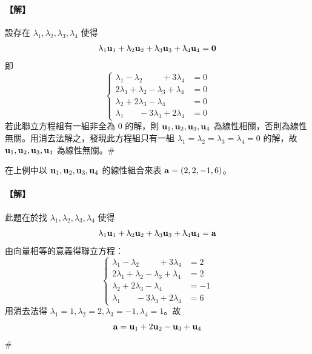 \paragraph{【解】}
設存在 $\lambda_1, \lambda_2, \lambda_3, \lambda_4$ 使得
\[ \uplambda_1\boldsymbol{\mathbf{u}}_1 + \uplambda_2\boldsymbol{\mathbf{u}}_2 + \uplambda_3\boldsymbol{\mathbf{u}}_3 + \uplambda_4\boldsymbol{\mathbf{u}}_4 = \boldsymbol{\mathbf{0}} \]
即
\begin{equation}
\left\{\begin{aligned}
\lambda_1 - \lambda_2 \phantom{+ 2\lambda_3} + 3\lambda_4 &= 0 \\
2\lambda_1 + \lambda_2 - \lambda_3 + \lambda_4 &= 0 \\
\lambda_2 + 2\lambda_3 - \lambda_4 &= 0 \\
\lambda_1 \phantom{+ \lambda_2} - 3\lambda_3 + 2\lambda_4 &= 0
\end{aligned}\right. \label{eq:b6-1-1-9}
\end{equation}
若此聯立方程組有一組非全為 0 的解，則 $\boldsymbol{\mathbf{u}}_1, \boldsymbol{\mathbf{u}}_2, \boldsymbol{\mathbf{u}}_3, \boldsymbol{\mathbf{u}}_4$ 為線性相關，否則為線性無關。用消去法解之，發現此方程組只有一組 $\lambda_1=\lambda_2=\lambda_3=\lambda_4=0$ 的解，故 $\boldsymbol{\mathbf{u}}_1, \boldsymbol{\mathbf{u}}_2, \boldsymbol{\mathbf{u}}_3, \boldsymbol{\mathbf{u}}_4$ 為線性無關。\hfill$\#$

\begin{example}\label{ex:b6-1-6}
在上例中以 $\boldsymbol{\mathbf{u}}_1, \boldsymbol{\mathbf{u}}_2, \boldsymbol{\mathbf{u}}_3, \boldsymbol{\mathbf{u}}_4$ 的線性組合來表 $\boldsymbol{\mathbf{a}}=(2, 2, -1, 6)$。
\end{example}

\paragraph{【解】}
此題在於找 $\lambda_1, \lambda_2, \lambda_3, \lambda_4$ 使得
\[ \uplambda_1\boldsymbol{\mathbf{u}}_1 + \uplambda_2\boldsymbol{\mathbf{u}}_2 + \uplambda_3\boldsymbol{\mathbf{u}}_3 + \uplambda_4\boldsymbol{\mathbf{u}}_4 = \boldsymbol{\mathbf{a}} \]
由向量相等的意義得聯立方程：
\begin{equation}
\left\{\begin{aligned}
\lambda_1 - \lambda_2 \phantom{+ 2\lambda_3} + 3\lambda_4 &= 2 \\
2\lambda_1 + \lambda_2 - \lambda_3 + \lambda_4 &= 2 \\
\lambda_2 + 2\lambda_3 - \lambda_4 &= -1 \\
\lambda_1 \phantom{+ \lambda_2} - 3\lambda_3 + 2\lambda_4 &= 6
\end{aligned}\right. \label{eq:b6-1-1-10}
\end{equation}
用消去法得 $\lambda_1=1, \lambda_2=2, \lambda_3=-1, \lambda_4=1$。故
\[ \boldsymbol{\mathbf{a}} = \boldsymbol{\mathbf{u}}_1 + 2\boldsymbol{\mathbf{u}}_2 - \boldsymbol{\mathbf{u}}_3 + \boldsymbol{\mathbf{u}}_4 \]\hfill$\#$

